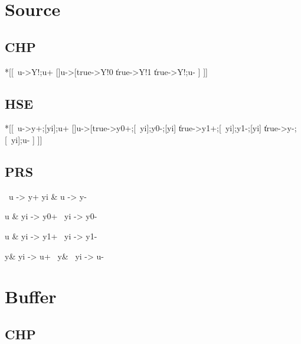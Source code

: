 \documentclass{article}
\begin{document}

\section{Source}

\subsection*{CHP}

\begin{csp}
*[[~u->Y!\phi;u+
  []u->[true->Y!0
         \|true->Y!1
         \|true->Y!\neg\phi;u-
         ]
 ]]
\end{csp}

\subsection*{HSE}

\begin{hse}
*[[~u->y\phi+;[yi];u+
  []u->[true->y0+;[~yi];y0-;[yi]
         \|true->y1+;[~yi];y1-;[yi]
         \|true->y\phi-;[~yi];u-
         ]
 ]]
\end{hse}

\subsection*{PRS}

\begin{prs2}
~u -> y\phi+
yi & u  -> y\phi-
\end{prs2}

\begin{prs2}
u & yi -> y0+
~yi -> y0-

u & yi -> y1+
~yi -> y1-
\end{prs2}

\begin{prs2}
y\phi & yi -> u+
~y\phi & ~yi -> u-
\end{prs2}

\section{Buffer}

\subsection*{CHP}
\end{document}
